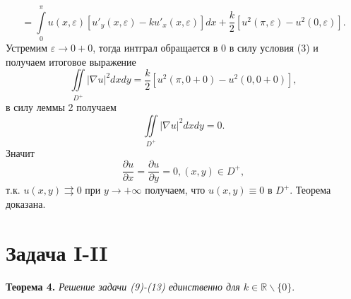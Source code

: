 \documentclass[12pt, a4paper]{article}
\begin{document}
	\begin{equation*}
		=  \int\limits_0^\pi u(x,\varepsilon) \left[ u'_y(x,\varepsilon) - k u'_x(x, \varepsilon) \right] dx + \dfrac{k}{2} \left[u^2(\pi, \varepsilon) - u^2(0, \varepsilon) \right].
	\end{equation*}
	Устремим $\varepsilon \to 0+0$, тогда интграл обращается в 0 в силу условия (3) и получаем итоговое выражение
	\begin{equation*}
		\iint\limits_{D^+}|\nabla u|^2 dx dy = \dfrac{k}{2} \left[u^2(\pi, 0+0) - u^2(0, 0+0) \right],
	\end{equation*}
	в силу леммы 2 получаем
	\begin{equation*}
		\iint\limits_{D^+}|\nabla u|^2 dx dy = 0.
	\end{equation*}
	Значит 
	\begin{equation*}
		\dfrac{\partial u}{\partial x} = \dfrac{\partial u}{\partial y} = 0, (x,y) \in D^+,
	\end{equation*}
	т.к. $u(x,y) \rightrightarrows 0$ при $y \to +\infty$  получаем, что $u(x,y) \equiv 0$ в $D^+$. Теорема доказана.
	
	
	\section{Задача I-II}
	
	
	\textbf{Теорема 4.} \textit{Решение задачи (9)-(13) единственно для $k \in \mathbb{R}  \backslash \{0\}$}.
	
\end{document}
